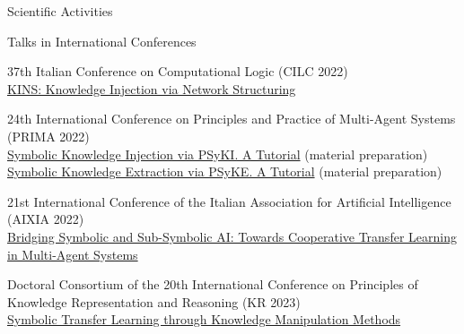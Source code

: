 \documentclass{resume} %
\begin{document}
\begin{rSection}{Scientific Activities}

        \begin{rSubsection2}{Talks in International Conferences}
            \item 37th Italian Conference on Computational Logic (CILC 2022)
            \\\href{https://apice.unibo.it/xwiki/bin/view/Talk/KinsCilc2022}{KINS: Knowledge Injection via Network Structuring}
            \item 24th International Conference on Principles and Practice of Multi-Agent Systems (PRIMA 2022)
            \\\href{https://apice.unibo.it/xwiki/bin/view/Talk/PsykitutorialPrima2022}{Symbolic Knowledge Injection via PSyKI. A Tutorial} (material preparation)
            \\\href{https://apice.unibo.it/xwiki/bin/view/Talk/PsykiPrima2022}{Symbolic Knowledge Extraction via PSyKE. A Tutorial} (material preparation)
            \item 21st International Conference of the Italian Association for Artificial Intelligence (AIXIA 2022)
            \\\href{https://apice.unibo.it/xwiki/bin/view/Talk/CtlAixia2022}{Bridging Symbolic and Sub-Symbolic AI: Towards Cooperative Transfer Learning in Multi-Agent Systems}
            \item Doctoral Consortium of the 20th International Conference on Principles of Knowledge Representation and Reasoning (KR 2023)
            \\\href{https://apice.unibo.it/xwiki/bin/view/Talk/SymbolicTransferLearning}{Symbolic Transfer Learning through Knowledge Manipulation Methods}
        \end{rSubsection2}


\end{rSection}
\end{document}
